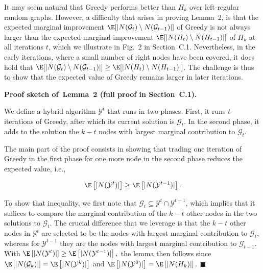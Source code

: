 It may seem natural that Greedy performs better than $H_{k}$ over left-regular random graphs. However, a difficulty that arises in proving Lemma 2, is that the expected marginal improvement $\E[|N(\mathcal{G}_{t})\setminus N(\mathcal{G}_{t-1})|]$ of Greedy is not always larger than the expected marginal improvement $\E[|N(H_{t})\setminus N(H_{t-1})|]$ of $H_{k}$ at all iterations $t$, which we illustrate in Fig. 2 in Section C.1.
Nevertheless, in the early iterations, where a small number of right nodes have been covered, it does hold that $\E[|N(\mathcal{G}_{t})\setminus N(\mathcal{G}_{t-1})|]\geq\E[|N(H_{t})\setminus N(H_{t-1})|]$. The challenge is thus to show that the expected value of Greedy remains larger in later iterations.\par




\par\medskip\noindent\textbf{Proof sketch of Lemma 2 (full proof in Section C.1).}\par



We define a hybrid algorithm $\mathcal{Y}^{t}$ that runs in two phases. First, it runs $t$ iterations of Greedy, after which its current solution is $\mathcal{G}_{t}$. In the second phase, it adds to the solution the $k-t$ nodes with largest marginal contribution to $\mathcal{G}_{t}$.\par




The main part of the proof consists in showing that trading one iteration of Greedy in the first phase for one more node in the second phase reduces the expected value, i.e.,\par


\[\begin{gathered}
\E\left[|N(\mathcal{Y}^{t})|\right]\geq\E\left[|N(\mathcal{Y}^{t-1})|\right].
\end{gathered}\]




To show that inequality, we first note that $\mathcal{G}_{t}\subseteq\mathcal{Y}^{t}\cap\mathcal{Y}^{t-1}$, which implies that it suffices to compare the marginal contribution of the $k-t$ other nodes in the two solutions to $\mathcal{G}_{t}$. The crucial difference that we leverage is that the $k-t$ other nodes in $\mathcal{Y}^{t}$ are selected to be the nodes with largest marginal contribution to $\mathcal{G}_{t}$, whereas for $\mathcal{Y}^{t-1}$ they are the nodes with largest marginal contribution to $\mathcal{G}_{t-1}$. With $\E\left[|N(\mathcal{Y}^{t})|\right]\geq\E\left[|N(\mathcal{Y}^{t-1})|\right],$
the lemma then follows since $\E\left[|N(\mathcal{G}_{k})|\right]=\E\left[|N(\mathcal{Y}^{k})|\right]$ and $\E\left[|N(\mathcal{Y}^{0})|\right]=\E\left[|N(H_{k})|\right].$
\ensuremath{\blacksquare}\par







